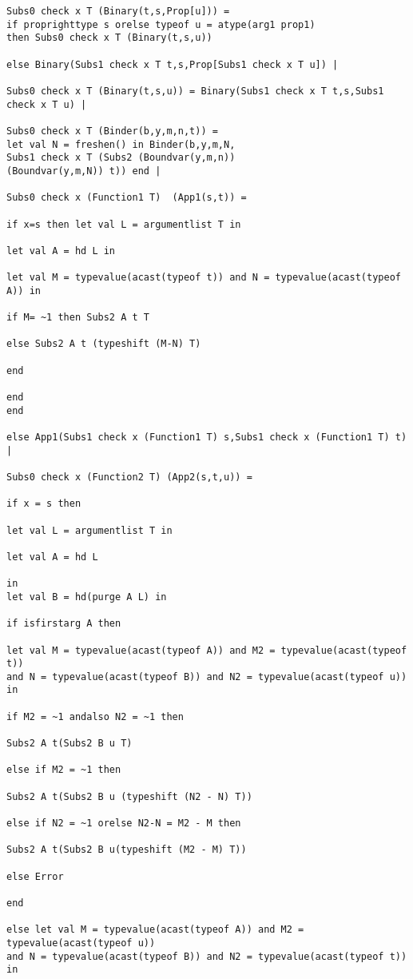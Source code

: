 \documentclass{article}
\begin{document}
{{\begin{verbatim}
Subs0 check x T (Binary(t,s,Prop[u])) =
if proprighttype s orelse typeof u = atype(arg1 prop1)
then Subs0 check x T (Binary(t,s,u))

else Binary(Subs1 check x T t,s,Prop[Subs1 check x T u]) |

Subs0 check x T (Binary(t,s,u)) = Binary(Subs1 check x T t,s,Subs1 check x T u) |

Subs0 check x T (Binder(b,y,m,n,t)) = 
let val N = freshen() in Binder(b,y,m,N,
Subs1 check x T (Subs2 (Boundvar(y,m,n)) 
(Boundvar(y,m,N)) t)) end |

Subs0 check x (Function1 T)  (App1(s,t)) =

if x=s then let val L = argumentlist T in

let val A = hd L in

let val M = typevalue(acast(typeof t)) and N = typevalue(acast(typeof A)) in

if M= ~1 then Subs2 A t T

else Subs2 A t (typeshift (M-N) T)

end

end
end

else App1(Subs1 check x (Function1 T) s,Subs1 check x (Function1 T) t) |

Subs0 check x (Function2 T) (App2(s,t,u)) =

if x = s then

let val L = argumentlist T in

let val A = hd L

in
let val B = hd(purge A L) in

if isfirstarg A then 

let val M = typevalue(acast(typeof A)) and M2 = typevalue(acast(typeof t))
and N = typevalue(acast(typeof B)) and N2 = typevalue(acast(typeof u)) in

if M2 = ~1 andalso N2 = ~1 then

Subs2 A t(Subs2 B u T)

else if M2 = ~1 then

Subs2 A t(Subs2 B u (typeshift (N2 - N) T))

else if N2 = ~1 orelse N2-N = M2 - M then

Subs2 A t(Subs2 B u(typeshift (M2 - M) T))

else Error

end

else let val M = typevalue(acast(typeof A)) and M2 = typevalue(acast(typeof u))
and N = typevalue(acast(typeof B)) and N2 = typevalue(acast(typeof t)) in


\end{verbatim}}}
\end{document}
